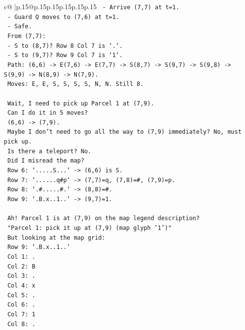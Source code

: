 \documentclass{article}
\begin{document}
{\begin{supertabular}{c@{$\;$}|p{.15\linewidth}@{}p{.15\linewidth}p{.15\linewidth}p{.15\linewidth}p{.15\linewidth}p{.15\linewidth}}
{{{\texttt{    {-} Arrive (7,7) at t=1.} \\
\texttt{    {-} Guard Q moves to (7,6) at t=1.} \\
\texttt{    {-} Safe.} \\
\texttt{    From (7,7):} \\
\texttt{    {-} S to (8,7)? Row 8 Col 7 is `.`.} \\
\texttt{    {-} S to (9,7)? Row 9 Col 7 is `1`.} \\
\texttt{    Path: (6,6) {-}> E(7,6) {-}> E(7,7) {-}> S(8,7) {-}> S(9,7) {-}> S(9,8) {-}> S(9,9) {-}> N(8,9) {-}> N(7,9).} \\
\texttt{    Moves: E, E, S, S, S, S, N, N. Still 8.} \\
\\ 
\texttt{    Wait, I need to pick up Parcel 1 at (7,9).} \\
\texttt{    Can I do it in 5 moves?} \\
\texttt{    (6,6) {-}> (7,9).} \\
\texttt{    Maybe I don't need to go all the way to (7,9) immediately? No, must pick up.} \\
\texttt{    Is there a teleport? No.} \\
\texttt{    Did I misread the map?} \\
\texttt{    Row 6: `.....S...` {-}> (6,6) is S.} \\
\texttt{    Row 7: `......q\#p` {-}> (7,7)=q, (7,8)=\#, (7,9)=p.} \\
\texttt{    Row 8: `.\#.....\#.` {-}> (8,8)=\#.} \\
\texttt{    Row 9: `.B.x..1..` {-}> (9,7)=1.} \\
\\ 
\texttt{    Ah! Parcel 1 is at (7,9) on the map legend description?} \\
\texttt{    "Parcel 1: pick it up at (7,9) (map glyph '1')"} \\
\texttt{    But looking at the map grid:} \\
\texttt{    Row 9: `.B.x..1..`} \\
\texttt{    Col 1: .} \\
\texttt{    Col 2: B} \\
\texttt{    Col 3: .} \\
\texttt{    Col 4: x} \\
\texttt{    Col 5: .} \\
\texttt{    Col 6: .} \\
\texttt{    Col 7: 1} \\
\texttt{    Col 8: .} \\
}}}
\end{supertabular}}
\end{document}

